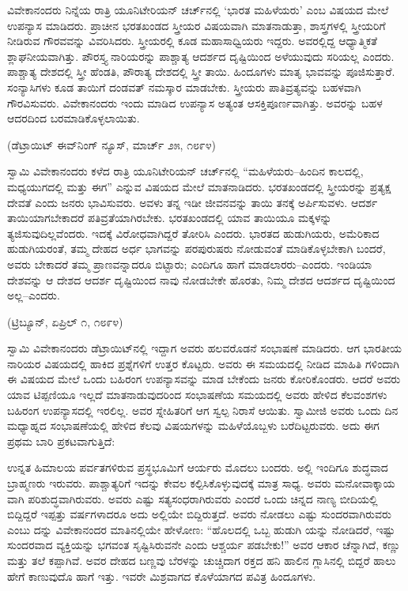 ವಿವೇಕಾನಂದರು ನಿನ್ನೆಯ ರಾತ್ರಿ ಯೂನಿಟೇರಿಯನ್​ ಚರ್ಚ್​ನಲ್ಲಿ ‘ಭಾರತ ಮಹಿಳೆಯರು’ ಎಂಬ ವಿಷಯದ ಮೇಲೆ ಉಪನ್ಯಾಸ ಮಾಡಿದರು. ಪ್ರಾಚೀನ ಭರತಖಂಡದ ಸ್ತ್ರೀಯರ ವಿಷಯವಾಗಿ ಮಾತನಾಡುತ್ತಾ, ಶಾಸ್ತ್ರಗಳಲ್ಲಿ ಸ್ತ್ರೀಯರಿಗೆ ನೀಡಿರುವ ಗೌರವವನ್ನು ವಿವರಿಸಿದರು. ಸ್ತ್ರೀಯರಲ್ಲಿ ಕೂಡ ಮಹಾಸಾಧ್ವಿಯರು ಇದ್ದರು. ಅವರಲ್ಲಿದ್ದ ಆಧ್ಯಾತ್ಮಿಕತೆ ಶ್ಲಾಘನೀಯವಾಗಿತ್ತು. ಪೌರಸ್ತ್ಯ ನಾರಿಯರನ್ನು ಪಾಶ್ಚಾತ್ಯ ಆದರ್ಶದ ದೃಷ್ಟಿಯಿಂದ ಅಳೆಯುವುದು ಸರಿಯಲ್ಲ ಎಂದರು. ಪಾಶ್ಚಾತ್ಯ ದೇಶದಲ್ಲಿ ಸ್ತ್ರೀ ಹೆಂಡತಿ, ಪೌರಾತ್ಯ ದೇಶದಲ್ಲಿ ಸ್ತ್ರೀ ತಾಯಿ. ಹಿಂದೂಗಳು ಮಾತೃ ಭಾವವನ್ನು ಪೂಜಿಸುತ್ತಾರೆ. ಸಂನ್ಯಾಸಿಗಳು ಕೂಡ ತಾಯಿಗೆ ದಂಡವತ್​ ನಮಸ್ಕಾರ ಮಾಡಬೇಕು. ಸ್ತ್ರೀಯರು ಪಾತಿವ್ರತ್ಯವನ್ನು ಬಹಳವಾಗಿ ಗೌರವಿಸುವರು. ವಿವೇಕಾನಂದರು ಇಂದು ಮಾಡಿದ ಉಪನ್ಯಾಸ ಅತ್ಯಂತ ಆಸಕ್ತಿಪೂರ್ಣವಾಗಿತ್ತು. ಅವರನ್ನು ಬಹಳ ಆದರದಿಂದ ಬರಮಾಡಿಕೊಳ್ಳಲಾಯಿತು.

\delimiter

\begin{center}
(ಡೆಟ್ರಾಯಿಟ್​ ಈವ್​ನಿಂಗ್​ ನ್ಯೂಸ್​, ಮಾರ್ಚ್​ ೨೫, ೧೮೯೪)
\end{center}

ಸ್ವಾಮಿ ವಿವೇಕಾನಂದರು ಕಳೆದ ರಾತ್ರಿ ಯೂನಿಟೇರಿಯನ್​ ಚರ್ಚ್​ನಲ್ಲಿ “ಮಹಿಳೆಯರು–ಹಿಂದಿನ ಕಾಲದಲ್ಲಿ, ಮಧ್ಯಯುಗದಲ್ಲಿ ಮತ್ತು ಈಗ” ಎನ್ನುವ ವಿಷಯದ ಮೇಲೆ ಮಾತನಾಡಿದರು. ಭರತಖಂಡದಲ್ಲಿ ಸ್ತ್ರೀಯರನ್ನು ಪ್ರತ್ಯಕ್ಷ ದೇವತೆ ಎಂದು ಜನರು ಭಾವಿಸುವರು. ಅವಳು ತನ್ನ ಇಡೀ ಜೀವನವನ್ನು ತಾಯಿ ತನಕ್ಕೆ ಅರ್ಪಿಸುವಳು. ಆದರ್ಶ ತಾಯಿಯಾಗಬೇಕಾದರೆ ಪತಿವ್ರತೆಯಾಗಿರಬೇಕು. ಭರತಖಂಡದಲ್ಲಿ ಯಾವ ತಾಯಿಯೂ ಮಕ್ಕಳನ್ನು ತ್ಯಜಿಸುವುದಿಲ್ಲವೆಂದರು. ಇದಕ್ಕೆ ವಿರೋಧವಾಗಿದ್ದರೆ ತೋರಿಸಿ ಎಂದರು. ಭಾರತದ ಹುಡುಗಿಯರು, ಅಮೆರಿಕಾದ ಹುಡುಗಿಯರಂತೆ, ತಮ್ಮ ದೇಹದ ಅರ್ಧ ಭಾಗವನ್ನು ಪರಪುರುಷರು ನೋಡುವಂತೆ ಮಾಡಿಕೊಳ್ಳಬೇಕಾಗಿ ಬಂದರೆ, ಅವರು ಬೇಕಾದರೆ ತಮ್ಮ ಪ್ರಾಣವನ್ನಾದರೂ ಬಿಟ್ಟಾರು; ಎಂದಿಗೂ ಹಾಗೆ ಮಾಡಲಾರರು–ಎಂದರು. ಇಂಡಿಯಾ ದೇಶವನ್ನು ಆ ದೇಶದ ಆದರ್ಶ ದೃಷ್ಟಿಯಿಂದ ನಾವು ನೋಡಬೇಕೇ ಹೊರತು, ನಿಮ್ಮ ದೇಶದ ಆದರ್ಶದ ದೃಷ್ಟಿಯಿಂದ ಅಲ್ಲ–ಎಂದರು.

\delimiter

\begin{center}
(ಟ್ರಿಬ್ಯೂನ್​, ಏಪ್ರಿಲ್​ ೧, ೧೮೯೪)
\end{center}

ಸ್ವಾಮಿ ವಿವೇಕಾನಂದರು ಡೆಟ್ರಾಯಿಟ್​ನಲ್ಲಿ ಇದ್ದಾಗ ಅವರು ಹಲವರೊಡನೆ ಸಂಭಾಷಣೆ ಮಾಡಿದರು. ಆಗ ಭಾರತೀಯ ನಾರಿಯರ ವಿಷಯದಲ್ಲಿ ಹಾಕಿದ ಪ್ರಶ್ನೆಗಳಿಗೆ ಉತ್ತರ ಕೊಟ್ಟರು. ಅವರು ಈ ಸಮಯದಲ್ಲಿ ನೀಡಿದ ಮಾಹಿತಿ ಗಳಿಂದಾಗಿ ಈ ವಿಷಯದ ಮೇಲೆ ಒಂದು ಬಹಿರಂಗ ಉಪನ್ಯಾಸವನ್ನು ಮಾಡ ಬೇಕೆಂದು ಜನರು ಕೋರಿಕೊಂಡರು. ಆದರೆ ಅವರು ಯಾವ ಟಿಪ್ಪಣಿಯೂ ಇಲ್ಲದೆ ಮಾತನಾಡುವುದರಿಂದ ಸಂಭಾಷಣೆಯ ಸಮಯದಲ್ಲಿ ಅವರು ಹೇಳಿದ ಕೆಲವಂಶಗಳು ಬಹಿರಂಗ ಉಪನ್ಯಾಸದಲ್ಲಿ ಇರಲಿಲ್ಲ. ಅವರ ಸ್ನೇಹಿತರಿಗೆ ಆಗ ಸ್ವಲ್ಪ ನಿರಾಸೆ ಆಯಿತು. ಸ್ವಾಮೀಜಿ ಅವರು ಒಂದು ದಿನ ಮಧ್ಯಾಹ್ನದ ಸಂಭಾಷಣೆಯಲ್ಲಿ ಹೇಳಿದ ಕೆಲವು ವಿಷಯಗಳನ್ನು ಮಹಿಳೆಯೊಬ್ಬಳು ಬರೆದಿಟ್ಟರುವರು. ಅದು ಈಗ ಪ್ರಥಮ ಬಾರಿ ಪ್ರಕಟವಾಗುತ್ತಿದೆ:

ಉನ್ನತ ಹಿಮಾಲಯ ಪರ್ವತಗಳಿರುವ ಪ್ರಸ್ಥಭೂಮಿಗೆ ಆರ್ಯರು ಮೊದಲು ಬಂದರು. ಅಲ್ಲಿ ಇಂದಿಗೂ ಶುದ್ಧವಾದ ಬ್ರಾಹ್ಮಣರು ಇರುವರು. ಪಾಶ್ಚಾತ್ಯರಿಗೆ ಇದನ್ನು ಕೇವಲ ಕಲ್ಪಿಸಿಕೊಳ್ಳುವುದಕ್ಕೆ ಮಾತ್ರ ಸಾಧ್ಯ. ಅವರು ಮನೋವಾಕ್ಕಾಯ ವಾಗಿ ಪರಿಶುದ್ಧವಾಗಿರುವರು. ಅವರು ಎಷ್ಟು ಸತ್ಯಸಂಧರಾಗಿರುವರು ಎಂದರೆ ಒಂದು ಚಿನ್ನದ ನಾಣ್ಯ ಬೀದಿಯಲ್ಲಿ ಬಿದ್ದಿದ್ದರೆ ಇಪ್ಪತ್ತು ವರ್ಷಗಳಾದರೂ ಅದು ಅಲ್ಲಿಯೇ ಬಿದ್ದಿರುತ್ತದೆ. ಅವರು ನೋಡಲು ಎಷ್ಟು ಸುಂದರವಾಗಿರುವರು ಎಂಬು ದನ್ನು ವಿವೇಕಾನಂದರ ಮಾತಿನಲ್ಲಿಯೇ ಹೇಳೋಣ: “ಹೊಲದಲ್ಲಿ ಒಬ್ಬ ಹುಡುಗಿ ಯನ್ನು ನೋಡಿದರೆ, ಇಷ್ಟು ಸುಂದರವಾದ ವ್ಯಕ್ತಿಯನ್ನು ಭಗವಂತ ಸೃಷ್ಟಿಸಿರುವನೇ ಎಂದು ಆಶ್ಚರ್ಯ ಪಡಬೇಕು!” ಅವರ ಆಕಾರ ಚೆನ್ನಾಗಿದೆ, ಕಣ್ಣು ಮತ್ತು ತಲೆ ಕಪ್ಪಾಗಿವೆ. ಅವರ ದೇಹದ ಬಣ್ಣವು ಬೆರಳನ್ನು ಚುಚ್ಚಿದಾಗ ರಕ್ತದ ಹನಿ ಹಾಲಿನ ಗ್ಲಾಸಿನಲ್ಲಿ ಬಿದ್ದರೆ ಹಾಲು ಹೇಗೆ ಕಾಣುವುದೊ ಹಾಗೆ ಇತ್ತು. ಇವರೇ ಮಿಶ್ರವಾಗದ ಕೊಳೆಯಾಗದ ಪವಿತ್ರ ಹಿಂದೂಗಳು.

